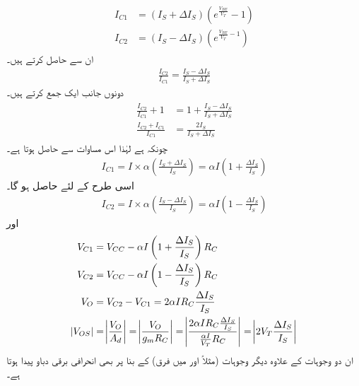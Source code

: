 \begin{gather}
\begin{aligned}
I_{C1}&=\left(I_S + \Delta I_S \right ) \left (e^{\frac{V_{BE}}{V_T}} -1\right )\\
I_{C2}&=\left(I_S - \Delta I_S \right ) \left (e^{\frac{V_{BE}}{V_T}-1} \right )
\end{aligned}
\end{gather}
ان سے  حاصل کرتے ہیں۔
\begin{align}
\frac{I_{C2}}{I_{C1}}=\frac{I_S-\Delta I_S}{I_S + \Delta I_S}
\end{align}
دونوں جانب ایک   جمع کرتے ہیں۔
\begin{gather}
\begin{aligned}
\frac{I_{C2}}{I_{C1}}+1 &=1+\frac{I_S - \Delta I_S}{I_S + \Delta I_S}\\
\frac{I_{C2}+I_{C1}}{I_{C1}}&=\frac{2 I_S}{I_S + \Delta I_S}
\end{aligned}
\end{gather}
چونکہ   ہے لہٰذا اس مساوات سے حاصل ہوتا ہے۔
\begin{align}
I_{C1}= I \times \alpha \left(\frac{I_S + \Delta I_S}{I_S} \right )=\alpha I \left (1+\frac{\Delta I_S}{I_S} \right )
\end{align}
اسی طرح   کے لئے حاصل ہو گا۔
\begin{align}
I_{C2}=I \times \alpha \left(\frac{I_S - \Delta I_S}{I_S} \right )=\alpha I \left (1-\frac{\Delta I_S}{I_S} \right )
\end{align}
اور
\begin{gather}
\begin{aligned}
V_{C1}&=V_{CC}-\alpha I \left(1+\frac{\Delta I_S}{I_S} \right ) R_C\\
V_{C2}&=V_{CC}-\alpha I \left(1- \frac{\Delta I_S}{I_S} \right ) R_C\\
V_O&=V_{C2}-V_{C1}=2 \alpha I R_C \frac{\Delta I_S}{I_S}\\
\abs{V_{OS}}&=\abs{\frac{V_{O}}{A_d}}=\abs{\frac{V_O}{g_m R_C}}=\abs{\frac{2 \alpha I R_C \frac{\Delta I_S}{I_S}}{\frac{\alpha I}{V_T} R_C}}=\abs{2 V_T \frac{\Delta I_S}{I_S}}
\end{aligned}
\end{gather}
ان دو وجوہات کے علاوہ دیگر وجوہات (مثلاً   اور  میں فرق) کے بنا پر بھی انحرافی برقی دباو پیدا ہوتا ہے۔

